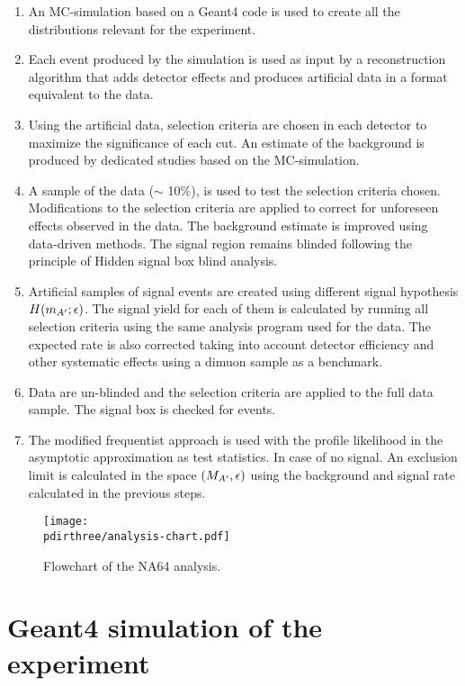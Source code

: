 \begin{enumerate}
\item An MC-simulation based on a Geant4 code is used to create all the distributions relevant for the experiment.
\item Each event produced by the simulation is used as input by a reconstruction algorithm that adds detector effects and produces artificial data in a format equivalent to the data.
\item Using the artificial data, selection criteria are chosen in each detector to maximize the significance of each cut. An estimate of the background is produced by dedicated studies based on the MC-simulation.
\item A sample of the data ($\sim$ 10\%), is used to test the selection criteria chosen. Modifications to the selection criteria are applied to correct for unforeseen effects observed in the data. The background estimate is improved using data-driven methods. The signal region remains blinded following the principle of Hidden signal box blind analysis.
\item Artificial samples of signal events are created using different signal hypothesis $H(m_{A'};\epsilon)$. The signal yield for each of them is calculated by running all selection criteria using the same analysis program used for the data. The expected rate is also corrected taking into account detector efficiency and other systematic effects using a dimuon sample as a benchmark.  
\item Data are un-blinded and the selection criteria are applied to the full data sample. The signal box is checked for events.
\item The modified frequentist approach is used with the profile likelihood in the asymptotic approximation as test statistics. In case of no signal. An exclusion limit is calculated in the space $(M_{A'},\epsilon)$ using the background and signal rate calculated in the previous steps.
\end{enumerate}

\begin{figure}[bth!]
  \centering
  \texttt{[image: \\pdirthree/analysis-chart.pdf]}
  \caption{Flowchart of the NA64 analysis.}
  \label{fig:analysis-chart}
\end{figure}

\section{Geant4 simulation of the experiment}
\label{ch3:sec:geant4}

